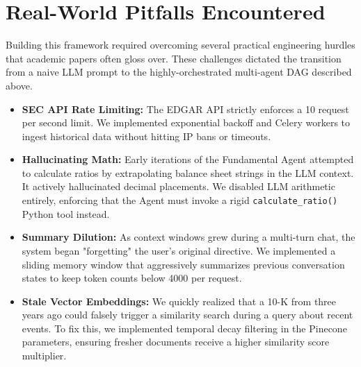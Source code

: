 \section{Real-World Pitfalls Encountered}

Building this framework required overcoming several practical engineering hurdles that academic papers often gloss over. These challenges dictated the transition from a naive LLM prompt to the highly-orchestrated multi-agent DAG described above.

\begin{itemize}
    \item \textbf{SEC API Rate Limiting:} The EDGAR API strictly enforces a 10 request per second limit. We implemented exponential backoff and Celery workers to ingest historical data without hitting IP bans or timeouts.
    \item \textbf{Hallucinating Math:} Early iterations of the Fundamental Agent attempted to calculate ratios by extrapolating balance sheet strings in the LLM context. It actively hallucinated decimal placements. We disabled LLM arithmetic entirely, enforcing that the Agent must invoke a rigid \texttt{calculate\_ratio()} Python tool instead.
    \item \textbf{Summary Dilution:} As context windows grew during a multi-turn chat, the system began "forgetting" the user's original directive. We implemented a sliding memory window that aggressively summarizes previous conversation states to keep token counts below 4000 per request.
    \item \textbf{Stale Vector Embeddings:} We quickly realized that a 10-K from three years ago could falsely trigger a similarity search during a query about recent events. To fix this, we implemented temporal decay filtering in the Pinecone parameters, ensuring fresher documents receive a higher similarity score multiplier.
\end{itemize}
